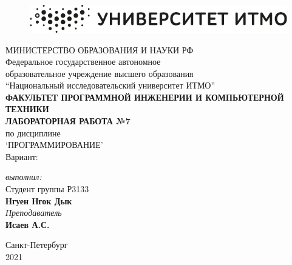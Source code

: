 \begin{center}

	\begin{figure}[H]
	\centering
	\includegraphics[scale=0.5]{img/logo}
	\end{figure}
	\hfill \break
	МИНИСТЕРСТВО ОБРАЗОВАНИЯ И НАУКИ РФ\\
	\hfill \break
	Федеральное государственное автономное\\
	образовательное учреждение высшего образования\\
	``Национальный исследовательский университет ИТМО''\\
	\hfill \break
	\textbf{ФАКУЛЬТЕТ ПРОГРАММНОЙ ИНЖЕНЕРИИ И КОМПЬЮТЕРНОЙ ТЕХНИКИ}\\
	\vspace{5cm}
	\large{\textbf{ЛАБОРАТОРНАЯ РАБОТА №7}}\\
	\hfill \break
	по дисциплине\\
	\large{`ПРОГРАММИРОВАНИЕ'}\\
	\hfill \break
	Вариант: 
	
	\vspace{4.5cm}
	
	\begin{flushright}
	\textit{выполнил:}\\
	Студент группы Р3133\\
	\textbf{Нгуен Нгок Дык}\\
	\textit{Преподаватель}\\
	\textbf{Исаев А.С.}
	\end{flushright}
\end{center}

\vfill

\vspace{4cm}
\begin{center} 
Санкт-Петербург\\
2021
\end{center}

\thispagestyle{empty}
\newpage